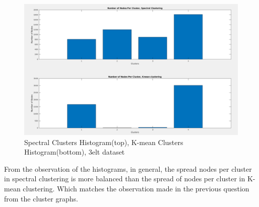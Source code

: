 \documentclass[unicode,11pt,a4paper,oneside,numbers=endperiod,openany]{scrartcl}
\begin{document}
\begin{enumerate}
\begin{figure}[h!]
    \begin{minipage}[c]{1\linewidth}
        \centering
        \includegraphics[width=0.4\linewidth]{./figures/3eltHistogram.png}
    \end{minipage}
  \caption{Spectral Clusters Histogram(top), K-mean Clusters Histogram(bottom), 3elt dataset}
\end{figure}

{From the observation of the histograms, in general, the spread nodes per cluster in spectral clustering is more balanced than the spread of nodes per cluster in K-mean clustering. Which matches the observation made in the previous question from the cluster graphs.}


\end{enumerate}
\end{document}
